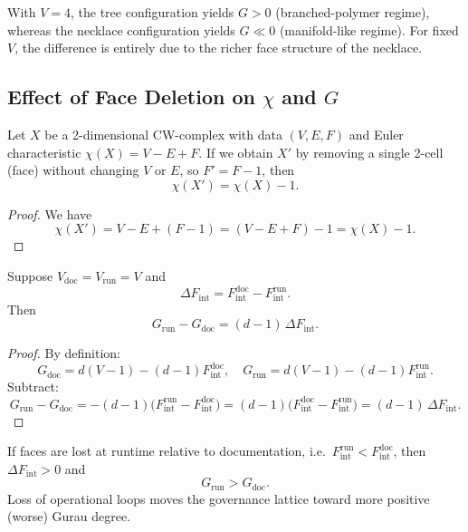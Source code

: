 \documentclass[11pt]{article}
\begin{document}
\begin{corollary}
With \(V=4\), the tree configuration yields \(G>0\) (branched-polymer regime), whereas the necklace configuration yields \(G\ll 0\) (manifold-like regime). For fixed \(V\), the difference is entirely due to the richer face structure of the necklace.
\end{corollary}

\subsection{Effect of Face Deletion on \(\chi\) and \(G\)}

\begin{lemma}
Let \(X\) be a 2-dimensional CW-complex with data \((V,E,F)\) and Euler characteristic \(\chi(X) = V - E + F\). If we obtain \(X'\) by removing a single 2-cell (face) without changing \(V\) or \(E\), so \(F' = F-1\), then
\[
\chi(X') = \chi(X) - 1.
\]
\end{lemma}

\begin{proof}
We have
\[
\chi(X') = V - E + (F-1) = (V - E + F) - 1 = \chi(X) - 1.
\]
\end{proof}

\begin{lemma}
Suppose \(V_{\mathrm{doc}} = V_{\mathrm{run}} = V\) and
\[
\Delta F_{\mathrm{int}} = F_{\mathrm{int}}^{\mathrm{doc}} - F_{\mathrm{int}}^{\mathrm{run}}.
\]
Then
\[
G_{\mathrm{run}} - G_{\mathrm{doc}} = (d - 1)\,\Delta F_{\mathrm{int}}.
\]
\end{lemma}

\begin{proof}
By definition:
\[
G_{\mathrm{doc}} = d(V - 1) - (d - 1)F_{\mathrm{int}}^{\mathrm{doc}},\quad
G_{\mathrm{run}} = d(V - 1) - (d - 1)F_{\mathrm{int}}^{\mathrm{run}}.
\]
Subtract:
\[
G_{\mathrm{run}} - G_{\mathrm{doc}}
= -(d-1)\big(F_{\mathrm{int}}^{\mathrm{run}} - F_{\mathrm{int}}^{\mathrm{doc}}\big)
= (d-1)\big(F_{\mathrm{int}}^{\mathrm{doc}} - F_{\mathrm{int}}^{\mathrm{run}}\big)
= (d-1)\,\Delta F_{\mathrm{int}}.
\]
\end{proof}

\begin{corollary}
If faces are lost at runtime relative to documentation, i.e.\ \(F_{\mathrm{int}}^{\mathrm{run}} < F_{\mathrm{int}}^{\mathrm{doc}}\), then \(\Delta F_{\mathrm{int}} > 0\) and
\[
G_{\mathrm{run}} > G_{\mathrm{doc}}.
\]
Loss of operational loops moves the governance lattice toward more positive (worse) Gurau degree.
\end{corollary}
\end{document}
